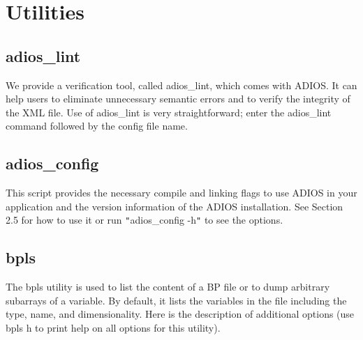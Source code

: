 \chapter{Utilities}

\section{adios\_lint}

We provide a verification tool, called adios\_lint, which comes with ADIOS. It 
can help users to eliminate unnecessary semantic errors and to verify the integrity 
of the XML file. Use of adios\_lint is very straightforward; enter the adios\_lint 
command followed by the config file name.

\section{adios\_config}

This script provides the necessary compile and linking flags to use ADIOS in your 
application and the version information of the ADIOS installation.  See Section 
2.5 for how to use it or run \texttt{"}adios\_config -h\texttt{"} to see the options. 


\section{bpls}

The bpls utility is used to list the content of a BP file or to dump arbitrary 
subarrays of a variable. By default, it lists the variables in the file including 
the type, name, and dimensionality. Here is the description of additional options 
(use bpls \-{}h to print help on all options for this utility).

